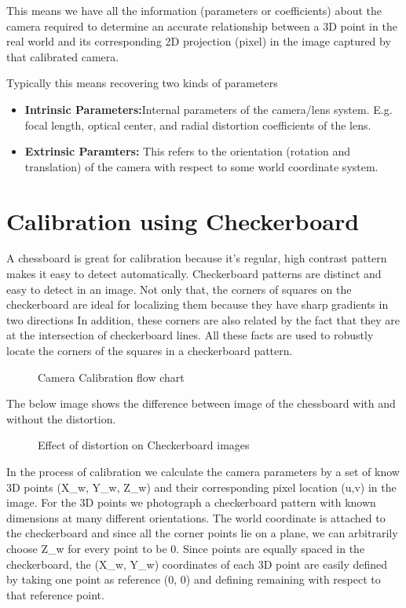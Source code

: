 This means we have all the information (parameters or coefficients) about the camera required to determine an accurate relationship between a 3D point in the real world
and its corresponding 2D projection (pixel) in the image captured by that calibrated camera.

Typically this means recovering two kinds of parameters

\begin{itemize}
	\item \textbf{Intrinsic Parameters:}Internal parameters of the camera/lens system. E.g. focal length, optical center, and radial distortion coefficients of the lens.
	\item \textbf{Extrinsic Paramters: }This refers to the orientation (rotation and translation) of the camera with respect to some world coordinate system.
\end{itemize}

\section{Calibration using Checkerboard}
A chessboard is great for calibration because it's regular, high contrast pattern makes it easy to detect automatically.  Checkerboard patterns are distinct and easy to detect in an image. Not only that, the corners of squares on the checkerboard are ideal for localizing them because they have sharp gradients in two directions
In addition, these corners are also related by the fact that they are at the intersection of checkerboard lines. All these facts are used to robustly locate the corners of the squares in a checkerboard pattern.
\begin{figure}[H]
	\centering
	\caption{Camera Calibration flow chart \cite{Sadekar:2020} }
\end{figure}
The below image shows the difference between image of the chessboard with and without the distortion.  
\begin{figure}[H]
	\centering
	\caption{Effect of distortion on Checkerboard images \cite{Sadekar:2020}}
\end{figure}
In the process of calibration we calculate the camera parameters by a set of know 3D points (X{\_}w, Y{\_}w, Z{\_}w) and their corresponding pixel location (u,v) in the image.
For the 3D points we photograph a checkerboard pattern with known dimensions at many different orientations. The world coordinate is attached to the checkerboard and since all the corner points lie on a plane, we can arbitrarily choose Z{\_}w for every point to be 0. Since points are equally spaced in the checkerboard, the (X{\_}w, Y{\_}w) coordinates of each 3D point are easily defined by taking one point as reference (0, 0) and defining remaining with respect to that reference point.
